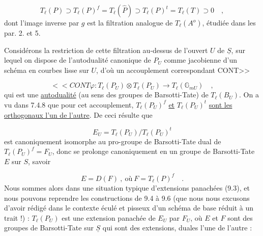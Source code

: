 \begin{equation}\tag{12.8.6}
T_\ell(P) \supset T_\ell(P)^f = T_\ell(\hat{P}) \supset T_\ell(P)^t = T_\ell(T) \supset 0 \quad ,
\end{equation}
dont l'image inverse par $g$ est la filtration analogue de $T_\ell(A^{o})$, étudiée dans les par. 2. et 5.

Considérons la restriction de cette filtration au-dessus de l'ouvert $U$ de $\underline{S}$, sur lequel on dispose de l'autodualité canonique de $P_U$ comme jacobienne d'un schéma en courbes lisse sur $U$, d'où un accouplement correspondant CONT>>



\begin{equation}\tag{12.8.7}
<<CONT \varphi : T_\ell(P_U) \otimes T_\ell(P_U) \longrightarrow T_\ell(\mathbb{G}_{mU}) \quad ,
\end{equation}
qui est une \underline{autodualité} (au sens des groupes de Barsotti-Tate) de $T_\ell(B_U)$. On a vu dans 7.4.8 \quad que pour cet accouplement, $T_\ell(P_U)^f$ \underline{et} $T_\ell(P_U)^t$ \underline{sont les orthogonaux l'un de l'autre}. De ceci résulte que

\begin{equation*}
E_U = T_\ell(P_U)/T_\ell(P_U)^t
\end{equation*}
est canoniquement isomorphe au pro-groupe de Barsotti-Tate dual de $T_\ell(P_U)^f = F_U$, donc se prolonge canoniquement en un groupe de Barsotti-Tate $E$ sur $S$, savoir

\begin{equation}\tag{12.8.8}
E = D(F) \ , \ \text{où} \ F = T_\ell(P)^f \quad .
\end{equation}
Nous sommes alors dans une situation typique d'extensions panachées (9.3), et nous pouvons reprendre les constructions de 9.4 à 9.6 (que nous nous excusons d'avoir rédigé dans le contexte éculé et pisseux d'un schéma de base réduit à un trait !) : $T_\ell(P_U)$ est une extension panachée de $E_U$ par $F_U$, où $E$ et $F$ sont des groupes de Barsotti-Tate sur $\underline{S}$ qui sont des extensions, duales l'une de l'autre :

